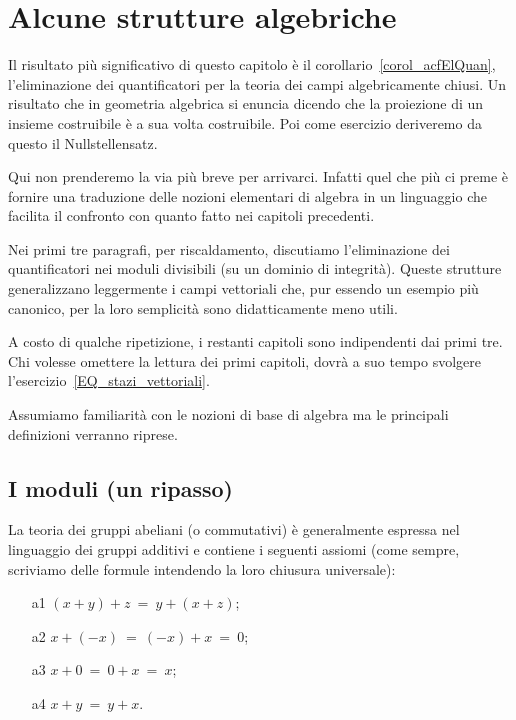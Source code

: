 \chapter{Alcune strutture algebriche}
\label{algebra}

\def\ceq#1#2#3{\parbox{30ex}{$\displaystyle #1$}\parbox{6ex}{\hfil$\displaystyle #2$}$\displaystyle  #3$}

\def\ceqb#1#2#3{\parbox{30ex}{\hfill\emph{$#1$}}\parbox{6ex}{\hfil\emph{\ $#2$}}\emph{$#3$}}


Il risultato pi\`u significativo di questo capitolo \`e il corollario~\ref{corol_acfElQuan}, l'eliminazione dei quantificatori per la teoria dei campi algebricamente chiusi. Un risultato che in geometria algebrica si enuncia dicendo che la proiezione di un insieme costruibile \`e a sua volta costruibile. Poi come esercizio deriveremo da questo il Nullstellensatz.

Qui non prenderemo la via pi\`u breve per arrivarci. Infatti quel che pi\`u ci preme \`e fornire una traduzione delle nozioni elementari di algebra in un linguaggio che facilita il confronto con quanto fatto nei capitoli precedenti. 

Nei primi tre paragrafi, per riscaldamento, discutiamo l'eliminazione dei quantificatori nei moduli divisibili (su un dominio di integrit\`a). Queste strutture generalizzano leggermente i campi vettoriali che, pur essendo un esempio pi\`u canonico, per la loro semplicit\`a sono didatticamente meno utili. 

A costo di qualche ripetizione, i restanti capitoli sono indipendenti dai primi tre. Chi volesse omettere la lettura dei primi capitoli, dovr\`a a suo tempo svolgere l'esercizio~\ref{EQ_stazi_vettoriali}.

Assumiamo familiarit\`a con le nozioni di base di algebra ma le principali definizioni verranno riprese. 

\section{I moduli (un ripasso)}
\label{gruppi}
La teoria dei gruppi abeliani (o commutativi) \`e generalmente espressa nel linguaggio dei gruppi additivi e contiene i seguenti assiomi (come sempre, scriviamo delle formule intendendo la loro chiusura universale):
\begin{itemize}
\item[a1] $(x+y) +z\ =\ y+(x+z)$;
\item[a2] $x+(-x)\ =\ (-x)+x\ =\ 0$;
\item[a3] $x+0\ = \ 0+x\ = \ x$;
\item[a4] $x+y\ =\ y+x$.
\end{itemize}

